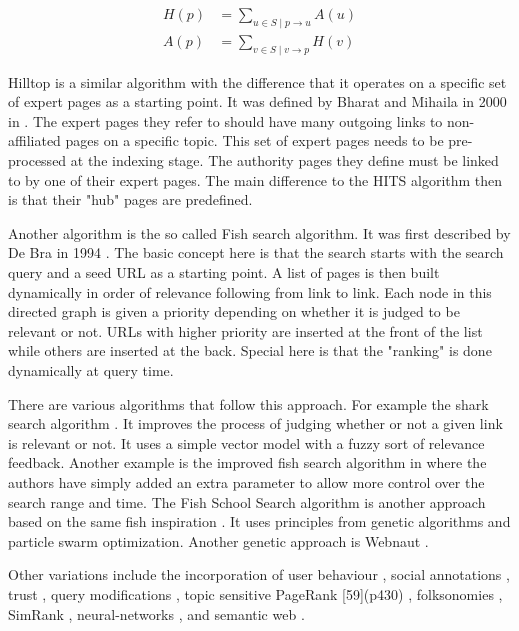 \begin{equation}
  \begin{split}
  H(p) &= \sum_{u\in S \mid p\to u}A(u)\\
  A(p) &= \sum_{v\in S \mid v\to p}H(v)
  \end{split}
  \label{eq:HITS}
\end{equation}

Hilltop is a similar algorithm with the difference that it operates on a specific set of expert pages as a starting point. It was defined by Bharat and Mihaila in 2000 in \citep{Bharat2000}. The expert pages they refer to should have many outgoing links to non-affiliated pages on a specific topic. This set of expert pages needs to be pre-processed at the indexing stage. The authority pages they define must be linked to by one of their expert pages. The main difference to the HITS algorithm then is that their "hub" pages are predefined.

Another algorithm is the so called Fish search algorithm. It was first described by De Bra in 1994 \citep{Debra1994, Debra1994a, Debra}. The basic concept here is that the search starts with the search query and a seed URL as a starting point. A list of pages is then built dynamically in order of relevance following from link to link. Each node in this directed graph is given a priority depending on whether it is judged to be relevant or not. URLs with higher priority are inserted at the front of the list while others are inserted at the back. Special here is that the "ranking" is done dynamically at query time.

There are various algorithms that follow this approach. For example the shark search algorithm \citep{Hersovici1998}. It improves the process of judging whether or not a given link is relevant or not. It uses a simple vector model with a fuzzy sort of relevance feedback. Another example is the improved fish search algorithm in \citep{Luo2005} where the authors have simply added an extra parameter to allow more control over the search range and time. The Fish School Search algorithm is another approach based on the same fish inspiration \citep{BastosFilho2008}. It uses principles from genetic algorithms and particle swarm optimization. Another genetic approach is Webnaut \citep{Nick2001}.

Other variations include the incorporation of user behaviour \citep{Agichtein2006}, social annotations \citep{Bao2007}, trust \citep{Garcia-Molina2004}, query modifications \citep{Glover2001}, topic sensitive PageRank [59](p430) \citep{Haveliwala2003}, folksonomies \citep{Hotho}, SimRank \citep{Jeh}, neural-networks \citep{Shu1999}, and semantic web \citep{Widyantoro2001,Du2007,Ding,Kamps,Taye2009}.

